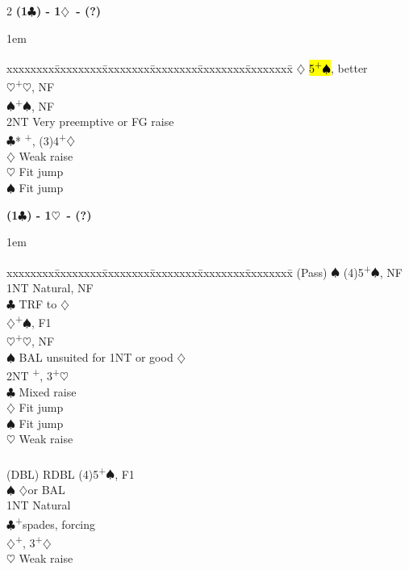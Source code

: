 \documentclass[10pt]{article}
\renewcommand{\c}{$\clubsuit$}
\renewcommand{\d}{$\diamondsuit$}
\newcommand{\h}{$\heartsuit$}
\newcommand{\s}{$\spadesuit$}
\newcommand{\p}{\textsuperscript{+}}
\newcommand{\x}{DBL}
\newcommand{\xx}{RDBL}
\newenvironment{bidtable}[1][]
{\textbf{#1}
  \begin{adjustwidth}{1em}{}
    \addvspace{2pt}
    \begin{tabbing}
      xxxxxxxx\=xxxxxxxx\=xxxxxxxx\=xxxxxxxx\=xxxxxxxx\=xxxxxxxx\=\kill}
{\end{tabbing}\end{adjustwidth}\bigskip}%
\begin{document}
\begin{multicols*}{2}
\begin{bidtable}[(1\c) - 1\d\ - (?)]
       \d  \> \hl{5\p\s}, better          \\
       \h  {}\p\h, NF                   \\
       \s  {}\p\s, NF                   \\
       \> 2NT  \> Very preemptive or FG raise \\
       \c* {}\p, (3)4\p\d               \\
       \d  \> Weak raise                  \\
       \h  \> Fit jump                    \\
       \s  \> Fit jump
\end{bidtable}

\begin{bidtable}[(1\c) - 1\h\ - (?)]
(Pass) \s     \> (4)5\p\s, NF                             \\
       \> 1NT     \> Natural, NF                              \\
       \c     \> TRF to \d                                \\
       \d     {}\p\s, F1                                \\
       \h     {}\p\h, NF                                \\
       \s     \> BAL unsuited for 1NT or good \d          \\
       \> 2NT     \p, 3\p\h                               \\
       \c     \> Mixed raise                              \\
       \d     \> Fit jump                                 \\
       \s     \> Fit jump                                 \\
       \h     \> Weak raise                               \\
                                                              \\
(\x)   \> \xx     \> (4)5\p\s, F1                             \\
       \s     \> \d or BAL\\
       \> 1NT     \> Natural                                  \\
       \c     {}\p spades, forcing                       \\
       \d     {}\p, 3\p\d\\
       \h     \> Weak raise                               \\

\end{bidtable}
\end{multicols*}
\end{document}
